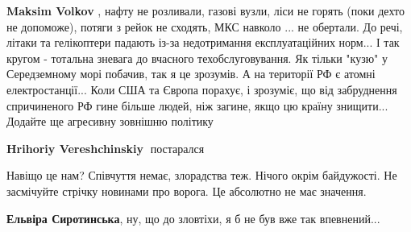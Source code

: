 \begin{itemize}
\begin{itemize}
\begin{itemize}
 
\textbf{Maksim Volkov} , нафту не розливали, газові вузли, ліси не горять (поки
дехто не допоможе), потяги з рейок не сходять, МКС навколо ... не обертали. До
речі, літаки та гелікоптери падають із-за недотримання експлуатаційних норм...
І так кругом - тотальна зневага до вчасного техобслуговування. Як тільки "кузю"
у Середземному морі побачив, так я це зрозумів. А на території РФ є атомні
електростанції... Коли США та Європа порахує, і зрозуміє, що від забруднення
спричиненого РФ гине більше людей, ніж загине, якщо цю країну знищити...
Додайте ще агресивну зовнішню політику

 
\textbf{Hrihoriy Vereshchinskiy} 🤣постарался
\end{itemize}

\end{itemize}

 

Навіщо це нам? Співчуття немає, злорадства теж. Нічого окрім байдужості. Не
засмічуйте стрічку новинами про ворога. Це абсолютно не має значення.

\begin{itemize}
 
\textbf{Ельвіра Сиротинська}, ну, що до зловтіхи, я б не був вже так впевнений...

 

\end{itemize}
\end{itemize}
